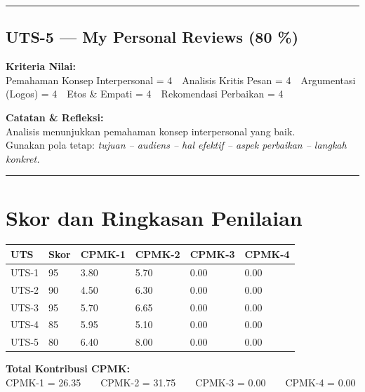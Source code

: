 \documentclass[
  letterpaper,
  DIV=11,
  numbers=noendperiod]{scrreprt}
\begin{document}
\begin{center}\rule{0.5\linewidth}{0.5pt}\end{center}

\subsection*{UTS-5 --- My Personal Reviews (80
\%)}\label{uts-5-my-personal-reviews-80}

\textbf{Kriteria Nilai:}\\
Pemahaman Konsep Interpersonal = 4 Analisis Kritis Pesan = 4 Argumentasi
(Logos) = 4 Etos \& Empati = 4 Rekomendasi Perbaikan = 4

\textbf{Catatan \& Refleksi:}\\
Analisis menunjukkan pemahaman konsep interpersonal yang baik.\\
Gunakan pola tetap: \emph{tujuan -- audiens -- hal efektif -- aspek
perbaikan -- langkah konkret.}

\begin{center}\rule{0.5\linewidth}{0.5pt}\end{center}

\section*{Skor dan Ringkasan
Penilaian}\label{skor-dan-ringkasan-penilaian}


\begin{longtable}[]{@{}llllll@{}}
\toprule\noalign{}
UTS & Skor & CPMK-1 & CPMK-2 & CPMK-3 & CPMK-4 \\
\midrule\noalign{}
\endhead
\bottomrule\noalign{}
\endlastfoot
UTS-1 & 95 & 3.80 & 5.70 & 0.00 & 0.00 \\
UTS-2 & 90 & 4.50 & 6.30 & 0.00 & 0.00 \\
UTS-3 & 95 & 5.70 & 6.65 & 0.00 & 0.00 \\
UTS-4 & 85 & 5.95 & 5.10 & 0.00 & 0.00 \\
UTS-5 & 80 & 6.40 & 8.00 & 0.00 & 0.00 \\
\end{longtable}

\textbf{Total Kontribusi CPMK:}\\
CPMK-1 = 26.35  CPMK-2 = 31.75  CPMK-3 = 0.00  CPMK-4 = 0.00
\end{document}
